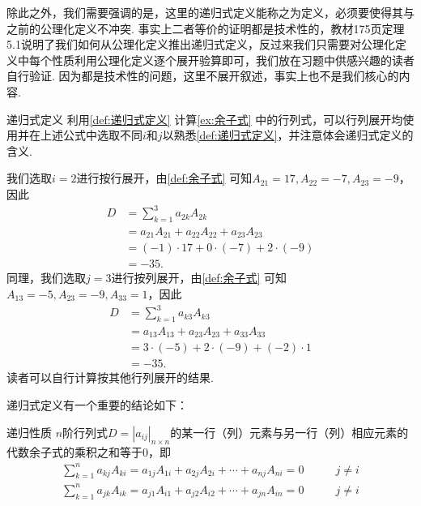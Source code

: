 除此之外，我们需要强调的是，这里的递归式定义能称之为定义，必须要使得其与之前的公理化定义不冲突. 事实上二者等价的证明都是技术性的，教材175页定理5.1说明了我们如何从公理化定义推出递归式定义，反过来我们只需要对公理化定义中每个性质利用公理化定义逐个展开验算即可，我们放在习题中供感兴趣的读者自行验证. 因为都是技术性的问题，这里不展开叙述，事实上也不是我们核心的内容.
\begin{example}{}{递归式定义}
    利用\autoref{def:递归式定义} 计算\autoref{ex:余子式} 中的行列式，可以行列展开均使用并在上述公式中选取不同$i$和$j$以熟悉\autoref*{def:递归式定义}，并注意体会递归式定义的含义.
\end{example}

\begin{solution}
    我们选取$i=2$进行按行展开，由\autoref{def:余子式} 可知$A_{21}=17,A_{22}=-7,A_{23}=-9$，因此
    \begin{align*}
        D & =\sum_{k=1}^{3}a_{2k}A_{2k}              \\
          & =a_{21}A_{21}+a_{22}A_{22}+a_{23}A_{23}  \\
          & =(-1) \cdot 17+0 \cdot (-7)+2 \cdot (-9) \\
          & =-35.
    \end{align*}
    同理，我们选取$j=3$进行按列展开，由\autoref{def:余子式} 可知$A_{13}=-5,A_{23}=-9,A_{33}=1$，因此
    \begin{align*}
        D & =\sum_{k=1}^{3}a_{k3}A_{k3}             \\
          & =a_{13}A_{13}+a_{23}A_{23}+a_{33}A_{33} \\
          & =3 \cdot (-5)+2 \cdot (-9)+(-2) \cdot 1 \\
          & =-35.
    \end{align*}
    读者可以自行计算按其他行列展开的结果.
\end{solution}

递归式定义有一个重要的结论如下：
\begin{theorem}{}{递归性质}
    $n$阶行列式$D=|a_{ij}|_{n \times n}$的某一行（列）元素与另一行（列）相应元素的代数余子式的乘积之和等于0，即
    \begin{align}
        \label{eq:13:递归式定义3}
        \sum_{k=1}^{n}a_{kj}A_{ki}=a_{1j}A_{1i}+a_{2j}A_{2i}+\cdots+a_{nj}A_{ni}=0 & \qquad j \neq i \\
        \label{eq:13:递归式定义4}
        \sum_{k=1}^{n}a_{jk}A_{ik}=a_{j1}A_{i1}+a_{j2}A_{i2}+\cdots+a_{jn}A_{in}=0 & \qquad j \neq i
    \end{align}
\end{theorem}

